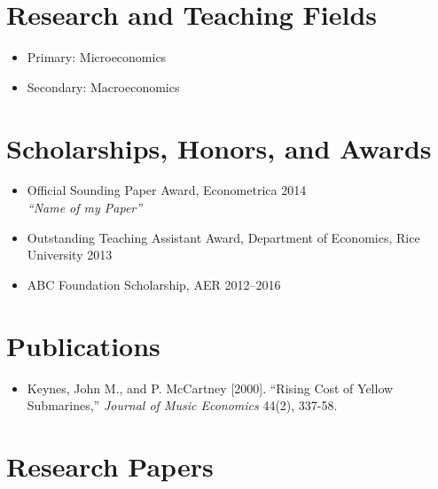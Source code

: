 \documentclass{article}[12]
\begin{document}
\section{Research and Teaching Fields}

\begin{itemize}
    \item Primary: Microeconomics 
    \item Secondary: Macroeconomics 
\end{itemize}


\section{Scholarships, Honors, and Awards}

\begin{itemize}
    \item Official Sounding Paper Award, Econometrica \hfill 2014 \\
    \emph{``Name of my Paper''}
    
    \item Outstanding Teaching Assistant Award, Department of Economics, Rice University \hfill 2013

    \item ABC Foundation Scholarship, AER \hfill 2012--2016
\end{itemize}



\section{Publications}

\begin{itemize}
    \item Keynes, John M., and P. McCartney [2000]. ``Rising Cost of Yellow Submarines,'' \emph{Journal of Music Economics} 44(2), 337-58.
\end{itemize}


\section{Research Papers}
\end{document}
